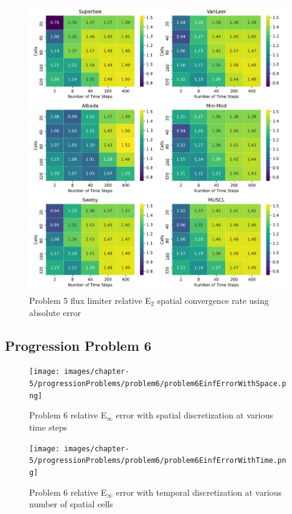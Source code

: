 \clearpage

\begin{figure}[p]
    \centering
    \includegraphics[width=6in]{images/chapter-5/progressionProblems/problem5/problem5E2FluxLimiterConvergenceRate.png}
    \caption{Problem 5 flux limiter relative E${}_{2}$ spatial convergence rate using absolute error}
    \label{fig:problem5_l2error_fluxlimiter_convergence_rate}
\end{figure}

\clearpage

\subsection{Progression Problem 6}
\begin{figure}[p]
    \centering
    \texttt{[image: images/chapter-5/progressionProblems/problem6/problem6EinfErrorWithSpace.png]}
    \caption{Problem 6 relative E${}_{\infty}$ error with spatial discretization at various time steps }
    \label{fig:problem6_linferror_spatial_results}
\end{figure}

\clearpage

\begin{figure}[p]
    \centering
    \texttt{[image: images/chapter-5/progressionProblems/problem6/problem6EinfErrorWithTime.png]}
    \caption{Problem 6 relative E${}_{\infty}$ error with temporal discretization at various number of spatial cells}
    \label{fig:problem6_linferror_time_results}
\end{figure}



